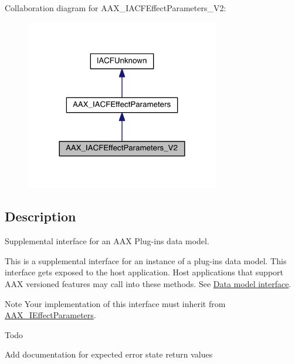 Collaboration diagram for A\+A\+X\+\_\+\+I\+A\+C\+F\+Effect\+Parameters\+\_\+\+V2\+:
\nopagebreak
\begin{figure}[H]
\begin{center}
\leavevmode
\includegraphics[width=240pt]{a00530}
\end{center}
\end{figure}


\subsection{Description}
Supplemental interface for an A\+A\+X Plug-\/in\textquotesingle{}s data model. 

This is a supplemental interface for an instance of a plug-\/in\textquotesingle{}s data model. This interface gets exposed to the host application. Host applications that support A\+A\+X versioned features may call into these methods. See \hyperlink{a00328}{Data model interface}.

\begin{DoxyNote}{Note}
Your implementation of this interface must inherit from \hyperlink{a00099}{A\+A\+X\+\_\+\+I\+Effect\+Parameters}.
\end{DoxyNote}
\begin{DoxyRefDesc}{Todo}
\item[\hyperlink{a00382__todo000032}{Todo}]Add documentation for expected error state return values\end{DoxyRefDesc}
